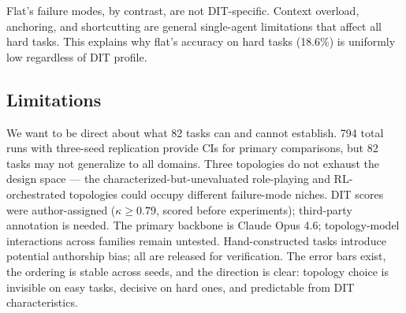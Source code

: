 Flat's failure modes, by contrast, are not DIT-specific. Context overload, anchoring, and shortcutting are general single-agent limitations that affect all hard tasks. This explains why flat's accuracy on hard tasks (18.6\%) is uniformly low regardless of DIT profile.

\subsection{Limitations}\label{sec:results-limitations}

We want to be direct about what 82 tasks can and cannot establish. 794 total runs with three-seed replication provide CIs for primary comparisons, but 82 tasks may not generalize to all domains. Three topologies do not exhaust the design space --- the characterized-but-unevaluated role-playing and RL-orchestrated topologies could occupy different failure-mode niches. DIT scores were author-assigned ($\kappa \geq 0.79$, scored before experiments); third-party annotation is needed. The primary backbone is Claude Opus 4.6; topology-model interactions across families remain untested. Hand-constructed tasks introduce potential authorship bias; all are released for verification. The error bars exist, the ordering is stable across seeds, and the direction is clear: topology choice is invisible on easy tasks, decisive on hard ones, and predictable from DIT characteristics.
